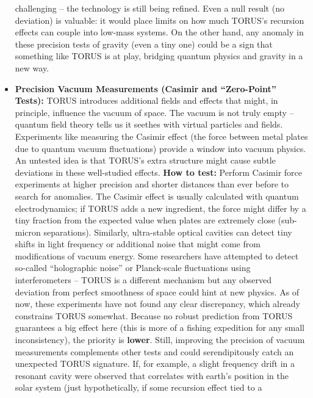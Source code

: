 \documentclass[
]{article}
\begin{document}
\begin{itemize}
  challenging -- the technology is still being refined. Even a null
  result (no deviation) is valuable: it would place limits on how much
  TORUS's recursion effects can couple into low-mass
  systems\hspace{0pt}. On the other hand, any anomaly in these precision
  tests of gravity (even a tiny one) could be a sign that something like
  TORUS is at play, bridging quantum physics and gravity in a new way.
\item
  \textbf{Precision Vacuum Measurements (Casimir and ``Zero-Point''
  Tests):} TORUS introduces additional fields and effects that might, in
  principle, influence the vacuum of space. The vacuum is not truly
  empty -- quantum field theory tells us it seethes with virtual
  particles and fields. Experiments like measuring the Casimir effect
  (the force between metal plates due to quantum vacuum fluctuations)
  provide a window into vacuum physics. An untested idea is that TORUS's
  extra structure might cause subtle deviations in these well-studied
  effects. \textbf{How to test:} Perform Casimir force experiments at
  higher precision and shorter distances than ever before to search for
  anomalies\hspace{0pt}. The Casimir effect is usually calculated with
  quantum electrodynamics; if TORUS adds a new ingredient, the force
  might differ by a tiny fraction from the expected value when plates
  are extremely close (sub-micron separations). Similarly, ultra-stable
  optical cavities can detect tiny shifts in light frequency or
  additional noise that might come from modifications of vacuum energy.
  Some researchers have attempted to detect so-called ``holographic
  noise'' or Planck-scale fluctuations using interferometers -- TORUS is
  a different mechanism but any observed deviation from perfect
  smoothness of space could hint at new physics\hspace{0pt}. As of now,
  these experiments have not found any clear discrepancy, which already
  constrains TORUS somewhat. Because no robust prediction from TORUS
  guarantees a big effect here (this is more of a fishing expedition for
  any small inconsistency), the priority is \textbf{lower}\hspace{0pt}.
  Still, improving the precision of vacuum measurements complements
  other tests and could serendipitously catch an unexpected TORUS
  signature. If, for example, a slight frequency drift in a resonant
  cavity were observed that correlates with earth's position in the
  solar system (just hypothetically, if some recursion effect tied to a

\end{itemize}
\end{document}
